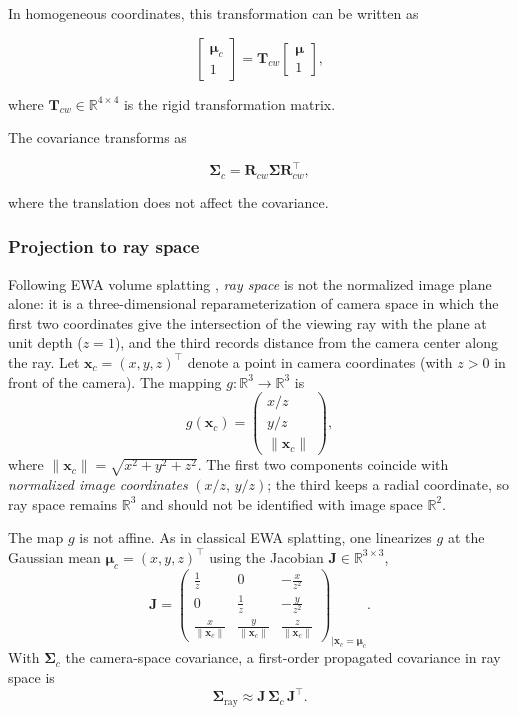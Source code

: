 In homogeneous coordinates, this transformation can be written as

\[
\begin{bmatrix}
\boldsymbol{\mu}_c \\
1
\end{bmatrix}
=
\mathbf{T}_{cw}
\begin{bmatrix}
\boldsymbol{\mu} \\
1
\end{bmatrix},
\]

where $\mathbf{T}_{cw} \in \mathbb{R}^{4 \times 4}$ is the rigid transformation matrix.

The covariance transforms as

\[
\boldsymbol{\Sigma}_c = \mathbf{R}_{cw} \boldsymbol{\Sigma} \mathbf{R}_{cw}^\top,
\]

where the translation does not affect the covariance.

\subsubsection{Projection to ray space}

Following EWA volume splatting \cite{zwicker2002ewa}, \emph{ray space} is not the normalized image plane alone: it is a three-dimensional reparameterization of camera space in which the first two coordinates give the intersection of the viewing ray with the plane at unit depth ($z=1$), and the third records distance from the camera center along the ray. Let $\mathbf{x}_c=(x,y,z)^\top$ denote a point in camera coordinates (with $z>0$ in front of the camera). The mapping $g:\mathbb{R}^3\to\mathbb{R}^3$ is
\[
g(\mathbf{x}_c)=
\begin{pmatrix}
x/z \\[2pt]
y/z \\[2pt]
\|\mathbf{x}_c\|
\end{pmatrix},
\]
where $\|\mathbf{x}_c\|=\sqrt{x^2+y^2+z^2}$. The first two components coincide with \emph{normalized image coordinates} $(x/z,\,y/z)$; the third keeps a radial coordinate, so ray space remains $\mathbb{R}^3$ and should not be identified with image space $\mathbb{R}^2$.

The map $g$ is not affine. As in classical EWA splatting, one linearizes $g$ at the Gaussian mean $\boldsymbol{\mu}_c=(x,y,z)^\top$ using the Jacobian $\mathbf{J}\in\mathbb{R}^{3\times 3}$,
\[
\mathbf{J}=
\begin{pmatrix}
\frac{1}{z} & 0 & -\frac{x}{z^2} \\[4pt]
0 & \frac{1}{z} & -\frac{y}{z^2} \\[4pt]
\frac{x}{\|\mathbf{x}_c\|} & \frac{y}{\|\mathbf{x}_c\|} & \frac{z}{\|\mathbf{x}_c\|}
\end{pmatrix}_{\Big|\mathbf{x}_c=\boldsymbol{\mu}_c}.
\]
With $\boldsymbol{\Sigma}_c$ the camera-space covariance, a first-order propagated covariance in ray space is
\[
\boldsymbol{\Sigma}_{\mathrm{ray}} \approx \mathbf{J}\,\boldsymbol{\Sigma}_c\,\mathbf{J}^\top.
\]

